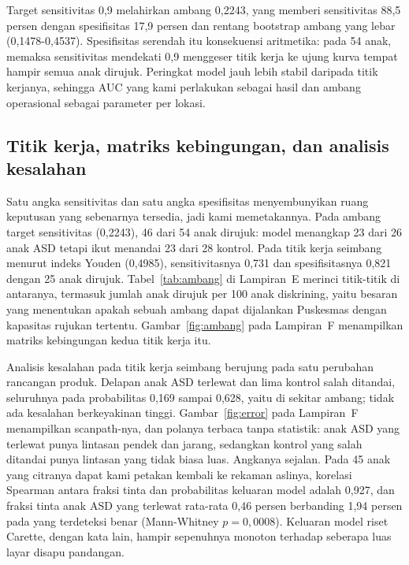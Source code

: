 \documentclass{article}
\begin{document}
Target sensitivitas 0,9 melahirkan ambang 0,2243, yang memberi sensitivitas 88,5 persen
dengan spesifisitas 17,9 persen dan rentang bootstrap ambang yang lebar
\mbox{(0,1478-0,4537)}. Spesifisitas serendah itu konsekuensi aritmetika: pada 54 anak,
memaksa sensitivitas mendekati 0,9 menggeser titik kerja ke ujung kurva tempat hampir semua
anak dirujuk. Peringkat model jauh lebih stabil daripada titik kerjanya, sehingga AUC yang
kami perlakukan sebagai hasil dan ambang operasional sebagai parameter per lokasi.

\subsection{Titik kerja, matriks kebingungan, dan analisis kesalahan}
\label{sec:titikkerja}

Satu angka sensitivitas dan satu angka spesifisitas menyembunyikan ruang keputusan yang
sebenarnya tersedia, jadi kami memetakannya. Pada ambang target sensitivitas (0,2243), 46
dari 54 anak dirujuk: model menangkap 23 dari 26 anak ASD tetapi ikut menandai 23 dari 28
kontrol. Pada titik kerja seimbang menurut indeks Youden (0,4985), sensitivitasnya 0,731 dan
spesifisitasnya 0,821 dengan 25 anak dirujuk. Tabel~\ref{tab:ambang} di Lampiran~E merinci
titik-titik di antaranya, termasuk jumlah anak dirujuk per 100 anak diskrining, yaitu besaran
yang menentukan apakah sebuah ambang dapat dijalankan Puskesmas dengan kapasitas rujukan
tertentu. Gambar~\ref{fig:ambang} pada Lampiran~F menampilkan matriks kebingungan kedua titik
kerja itu.

Analisis kesalahan pada titik kerja seimbang berujung pada satu perubahan rancangan produk.
Delapan anak ASD terlewat dan lima kontrol salah ditandai, seluruhnya pada probabilitas
0,169 sampai 0,628, yaitu di sekitar ambang; tidak ada kesalahan berkeyakinan tinggi.
Gambar~\ref{fig:error} pada Lampiran~F menampilkan scanpath-nya, dan polanya terbaca tanpa
statistik: anak ASD yang terlewat punya lintasan pendek dan jarang, sedangkan kontrol yang
salah ditandai punya lintasan yang tidak biasa luas. Angkanya sejalan. Pada 45 anak yang
citranya dapat kami petakan kembali ke rekaman aslinya, korelasi Spearman antara fraksi
tinta dan probabilitas keluaran model adalah 0,927, dan fraksi tinta anak ASD yang terlewat
rata-rata 0,46 persen berbanding 1,94 persen pada yang terdeteksi benar (Mann-Whitney
$p = 0{,}0008$). Keluaran model riset Carette, dengan kata lain, hampir sepenuhnya monoton
terhadap seberapa luas layar disapu pandangan.
\end{document}
